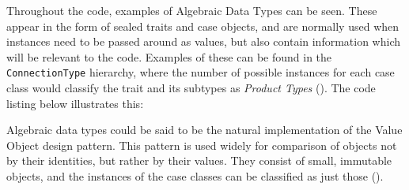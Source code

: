 Throughout the code, examples of Algebraic Data Types can be seen. These appear
in the form of sealed traits and case objects, and are normally used when
instances need to be passed around as values, but also contain information
which will be relevant to the code. Examples of these can be found in the
\texttt{ConnectionType} hierarchy, where the number of possible instances for
each case class would classify the trait and its subtypes as \emph{Product
Types} (\cite[][p.~411]{wampler2015programming}). The code listing below
illustrates this:

{
  \small
  
}

Algebraic data types could be said to be the natural implementation of the
Value Object design pattern. This pattern is used widely for comparison of
objects not by their identities, but rather by their values. They consist of
small, immutable objects, and the instances of the case classes can be
classified as just those (\cite[][Ch.~8,~Location~3068]{nikolov2016scala}).
